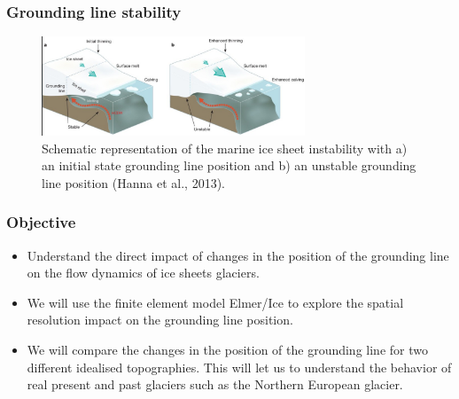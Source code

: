 \documentclass[11pt]{beamer}
\begin{document}
\begin{frame}
	\frametitle{Grounding line stability}
		\begin{center}
	\begin{figure}[!h]
		\includegraphics[width=0.7\textwidth]{../fig/MISI.png} %
		\caption{\footnotesize Schematic representation of the marine ice sheet instability with a) an initial state grounding line position and b) an unstable grounding line position (Hanna et al., 2013).}
	\end{figure}
\end{center}
\end{frame}
\begin{frame}
	\frametitle{Objective}
	\begin{itemize}
		\item Understand the direct impact of changes in the position of the grounding line on the flow dynamics of ice sheets glaciers.
		\item We will use the finite element model Elmer/Ice to explore the spatial resolution impact on the grounding line position.
		\item We will compare the changes in the position of the grounding line for two different idealised topographies. This will let us to understand the behavior of real present and past glaciers such as the Northern European glacier. 
	\end{itemize}
\end{frame}
\end{document}
